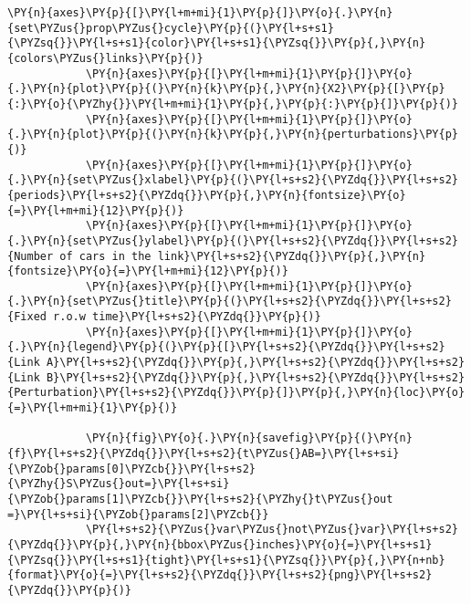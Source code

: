 \begin{Verbatim}[commandchars=\\\{\}]
            \PY{n}{axes}\PY{p}{[}\PY{l+m+mi}{1}\PY{p}{]}\PY{o}{.}\PY{n}{set\PYZus{}prop\PYZus{}cycle}\PY{p}{(}\PY{l+s+s1}{\PYZsq{}}\PY{l+s+s1}{color}\PY{l+s+s1}{\PYZsq{}}\PY{p}{,}\PY{n}{colors\PYZus{}links}\PY{p}{)}
            \PY{n}{axes}\PY{p}{[}\PY{l+m+mi}{1}\PY{p}{]}\PY{o}{.}\PY{n}{plot}\PY{p}{(}\PY{n}{k}\PY{p}{,}\PY{n}{X2}\PY{p}{[}\PY{p}{:}\PY{o}{\PYZhy{}}\PY{l+m+mi}{1}\PY{p}{,}\PY{p}{:}\PY{p}{]}\PY{p}{)}
            \PY{n}{axes}\PY{p}{[}\PY{l+m+mi}{1}\PY{p}{]}\PY{o}{.}\PY{n}{plot}\PY{p}{(}\PY{n}{k}\PY{p}{,}\PY{n}{perturbations}\PY{p}{)}
            \PY{n}{axes}\PY{p}{[}\PY{l+m+mi}{1}\PY{p}{]}\PY{o}{.}\PY{n}{set\PYZus{}xlabel}\PY{p}{(}\PY{l+s+s2}{\PYZdq{}}\PY{l+s+s2}{periods}\PY{l+s+s2}{\PYZdq{}}\PY{p}{,}\PY{n}{fontsize}\PY{o}{=}\PY{l+m+mi}{12}\PY{p}{)}
            \PY{n}{axes}\PY{p}{[}\PY{l+m+mi}{1}\PY{p}{]}\PY{o}{.}\PY{n}{set\PYZus{}ylabel}\PY{p}{(}\PY{l+s+s2}{\PYZdq{}}\PY{l+s+s2}{Number of cars in the link}\PY{l+s+s2}{\PYZdq{}}\PY{p}{,}\PY{n}{fontsize}\PY{o}{=}\PY{l+m+mi}{12}\PY{p}{)}
            \PY{n}{axes}\PY{p}{[}\PY{l+m+mi}{1}\PY{p}{]}\PY{o}{.}\PY{n}{set\PYZus{}title}\PY{p}{(}\PY{l+s+s2}{\PYZdq{}}\PY{l+s+s2}{Fixed r.o.w time}\PY{l+s+s2}{\PYZdq{}}\PY{p}{)}
            \PY{n}{axes}\PY{p}{[}\PY{l+m+mi}{1}\PY{p}{]}\PY{o}{.}\PY{n}{legend}\PY{p}{(}\PY{p}{[}\PY{l+s+s2}{\PYZdq{}}\PY{l+s+s2}{Link A}\PY{l+s+s2}{\PYZdq{}}\PY{p}{,}\PY{l+s+s2}{\PYZdq{}}\PY{l+s+s2}{Link B}\PY{l+s+s2}{\PYZdq{}}\PY{p}{,}\PY{l+s+s2}{\PYZdq{}}\PY{l+s+s2}{Perturbation}\PY{l+s+s2}{\PYZdq{}}\PY{p}{]}\PY{p}{,}\PY{n}{loc}\PY{o}{=}\PY{l+m+mi}{1}\PY{p}{)}
            
            \PY{n}{fig}\PY{o}{.}\PY{n}{savefig}\PY{p}{(}\PY{n}{f}\PY{l+s+s2}{\PYZdq{}}\PY{l+s+s2}{t\PYZus{}AB=}\PY{l+s+si}{\PYZob{}params[0]\PYZcb{}}\PY{l+s+s2}{\PYZhy{}S\PYZus{}out=}\PY{l+s+si}{\PYZob{}params[1]\PYZcb{}}\PY{l+s+s2}{\PYZhy{}t\PYZus{}out =}\PY{l+s+si}{\PYZob{}params[2]\PYZcb{}}
            \PY{l+s+s2}{\PYZus{}var\PYZus{}not\PYZus{}var}\PY{l+s+s2}{\PYZdq{}}\PY{p}{,}\PY{n}{bbox\PYZus{}inches}\PY{o}{=}\PY{l+s+s1}{\PYZsq{}}\PY{l+s+s1}{tight}\PY{l+s+s1}{\PYZsq{}}\PY{p}{,}\PY{n+nb}{format}\PY{o}{=}\PY{l+s+s2}{\PYZdq{}}\PY{l+s+s2}{png}\PY{l+s+s2}{\PYZdq{}}\PY{p}{)}
\end{Verbatim}


